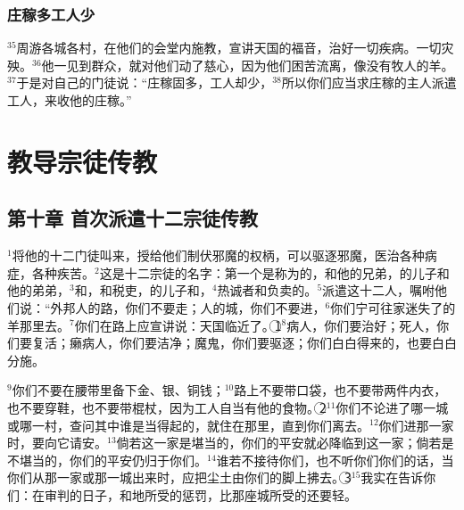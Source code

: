 \subsubsection{庄稼多工人少}
$^{35}$\UL[耶稣]周游各城各村，在他们的会堂内施教，宣讲天国的福音，治好一切疾病。一切灾殃。$^{36}$他一见到群众，就对他们动了慈心，因为他们困苦流离，像没有牧人的羊。$^{37}$于是对自己的门徒说：“庄稼固多，工人却少，$^{38}$所以你们应当求庄稼的主人派遣工人，来收他的庄稼。”


\section{教导宗徒传教}


\subsection{第十章 首次派遣十二宗徒传教}
$^{1}$\UL[耶稣]将他的十二门徒叫来，授给他们制伏邪魔的权柄，可以驱逐邪魔，医治各种病症，各种疾苦。$^{2}$这是十二宗徒的名字：第一个是称为\UL[伯多禄]的\UL[西满]，和他的兄弟\UL[安德肋]，\UL[载伯德]的儿子\UL[雅各伯]和他的弟弟\UL[若望]，$^{3}$\UL[斐理伯]和\UL[巴尔多禄茂]，\UL[多默]和税吏\UL[玛窦]，\UL[阿耳斐]的儿子\UL[雅各伯]和\UL[达陡]，$^{4}$热诚者\UL[西满]和负卖\UL[耶稣]的\UL[犹达斯]\UL[依斯加略]。$^{5}$\UL[耶稣]派遣这十二人，嘱咐他们说：“外邦人的路，你们不要走；\UL[撒玛黎雅]人的城，你们不要进，$^{6}$你们宁可往\UL[以色列]家迷失了的羊那里去。$^{7}$你们在路上应宣讲说：天国临近了。\textcircled{1}$^{8}$病人，你们要治好；死人，你们要复活；癞病人，你们要洁净；魔鬼，你们要驱逐；你们白白得来的，也要白白分施。


$^{9}$你们不要在腰带里备下金、银、铜钱；$^{10}$路上不要带口袋，也不要带两件内衣，也不要穿鞋，也不要带棍杖，因为工人自当有他的食物。\textcircled{2}$^{11}$你们不论进了哪一城或哪一村，查问其中谁是当得起的，就住在那里，直到你们离去。$^{12}$你们进那一家时，要向它请安。$^{13}$倘若这一家是堪当的，你们的平安就必降临到这一家；倘若是不堪当的，你们的平安仍归于你们。$^{14}$谁若不接待你们，也不听你们你们的话，当你们从那一家或那一城出来时，应把尘土由你们的脚上拂去。\textcircled{3}$^{15}$我实在告诉你们：在审判的日子，\UL[索多玛]和\UL[哈摩辣]地所受的惩罚，比那座城所受的还要轻。


